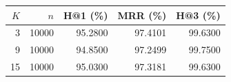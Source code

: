\begin{tabular}{rrrrr}
\toprule
$K$ & $n$ & H@1 (\%) & MRR (\%) & H@3 (\%) \\
\midrule
3 & 10000 & 95.2800 & 97.4101 & 99.6300 \\
9 & 10000 & 94.8500 & 97.2499 & 99.7500 \\
15 & 10000 & 95.0300 & 97.3181 & 99.6300 \\
\bottomrule
\end{tabular}
